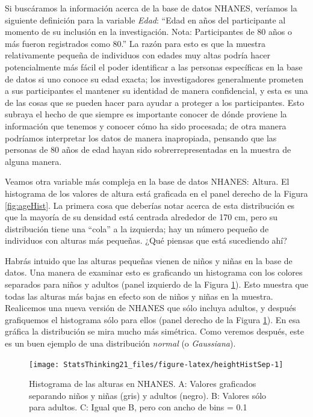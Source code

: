 \documentclass[
  12pt,
]{book}
\begin{document}
Si buscáramos la información acerca de la base de datos NHANES, veríamos la siguiente definición para la variable \emph{Edad}: ``Edad en años del participante al momento de su inclusión en la investigación. Nota: Participantes de 80 años o más fueron registrados como 80.'' La razón para esto es que la muestra relativamente pequeña de individuos con edades muy altas podría hacer potencialmente más fácil el poder identificar a las personas específicas en la base de datos si uno conoce su edad exacta; los investigadores generalmente prometen a sus participantes el mantener su identidad de manera confidencial, y esta es una de las cosas que se pueden hacer para ayudar a proteger a los participantes. Esto subraya el hecho de que siempre es importante conocer de dónde proviene la información que tenemos y conocer cómo ha sido procesada; de otra manera podríamos interpretar los datos de manera inapropiada, pensando que las personas de 80 años de edad hayan sido sobrerrepresentadas en la muestra de alguna manera.

Veamos otra variable más compleja en la base de datos NHANES: Altura. El histograma de los valores de altura está graficada en el panel derecho de la Figura \ref{fig:ageHist}. La primera cosa que deberías notar acerca de esta distribución es que la mayoría de su densidad está centrada alrededor de 170 cm, pero su distribución tiene una ``cola'' a la izquierda; hay un número pequeño de individuos con alturas más pequeñas. ¿Qué piensas que está sucediendo ahí?

Habrás intuido que las alturas pequeñas vienen de niños y niñas en la base de datos. Una manera de examinar esto es graficando un histograma con los colores separados para niños y adultos (panel izquierdo de la Figura \ref{fig:heightHistSep}). Esto muestra que todas las alturas más bajas en efecto son de niños y niñas en la muestra. Realicemos una nueva versión de NHANES que sólo incluya adultos, y después grafiquemos el histograma sólo para ellos (panel derecho de la Figura \ref{fig:heightHistSep}). En esa gráfica la distribución se mira mucho más simétrica. Como veremos después, este es un buen ejemplo de una distribución \emph{normal} (o \emph{Gaussiana}).

\begin{figure}
\texttt{[image: StatsThinking21\_files/figure-latex/heightHistSep-1]} \caption{Histograma de las alturas en NHANES. A: Valores graficados separando niños y niñas (gris) y adultos (negro). B: Valores sólo para adultos. C: Igual que B, pero con ancho de bins = 0.1}\label{fig:heightHistSep}
\end{figure}
\end{document}
